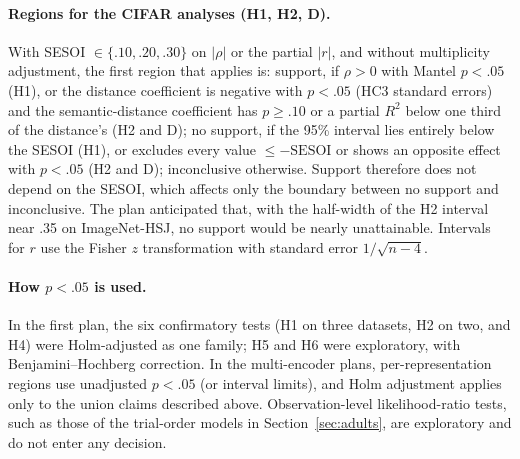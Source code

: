 \paragraph{Regions for the CIFAR analyses (H1, H2, D).} With SESOI $\in \{.10, .20, .30\}$ on $|\rho|$ or the partial $|r|$, and without multiplicity adjustment, the first region that applies is: support, if $\rho > 0$ with Mantel $p < .05$ (H1), or the distance coefficient is negative with $p < .05$ (HC3 standard errors) and the semantic-distance coefficient has $p \geq .10$ or a partial $R^2$ below one third of the distance's (H2 and D); no support, if the 95\% interval lies entirely below the SESOI (H1), or excludes every value $\leq -\mathrm{SESOI}$ or shows an opposite effect with $p < .05$ (H2 and D); inconclusive otherwise. Support therefore does not depend on the SESOI, which affects only the boundary between no support and inconclusive. The plan anticipated that, with the half-width of the H2 interval near .35 on ImageNet-HSJ, no support would be nearly unattainable. Intervals for $r$ use the Fisher $z$ transformation with standard error $1/\sqrt{n - 4}$.

\paragraph{How $p < .05$ is used.} In the first plan, the six confirmatory tests (H1 on three datasets, H2 on two, and H4) were Holm-adjusted as one family; H5 and H6 were exploratory, with Benjamini--Hochberg correction. In the multi-encoder plans, per-representation regions use unadjusted $p < .05$ (or interval limits), and Holm adjustment applies only to the union claims described above. Observation-level likelihood-ratio tests, such as those of the trial-order models in Section~\ref{sec:adults}, are exploratory and do not enter any decision.
